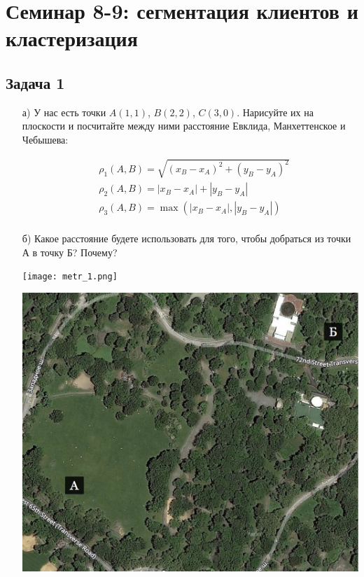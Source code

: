 \documentclass[12pt, a4paper, oneside]{article}
\begin{document}
\section*{Семинар 8-9:  сегментация клиентов и кластеризация}

\subsection*{Задача 1 }

\begin{enumerate}

\item[а)] У нас есть точки $A(1,1)$, $B(2,2)$, $C(3,0)$. Нарисуйте их на плоскости и посчитайте между ними расстояние Евклида, Манхеттенское и Чебышева: 

\begin{equation}
\begin{aligned}
& \rho_1(A,B) = \sqrt{(x_B - x_A)^2 + (y_B - y_A)^2} \\ 
& \rho_2(A,B) = |x_B - x_A| + |y_B - y_A|  \\
& \rho_3(A,B) = \max(|x_B - x_A|, |y_B - y_A|) \\
\end{aligned}
\end{equation}


\item[б)] Какое расстояние будете использовать для того, чтобы добраться из точки А в точку Б? Почему? 

\begin{minipage}[t]{0.45\textwidth}
	\texttt{[image: metr\_1.png]}
\end{minipage}
\hfill
\begin{minipage}[t]{0.45\textwidth}
	\includegraphics[scale=0.12]{metr_2.png}
\end{minipage}


\end{enumerate}
\end{document}
